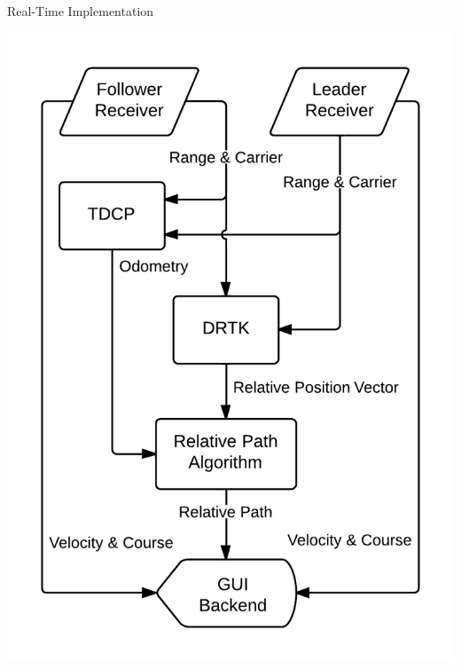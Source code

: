 \documentclass{beamer}
\begin{document}
    \begin{frame}{Real-Time Implementation}
      \begin{minipage}{\textwidth}
        \centering
        \includegraphics[height=\textheight]{../graphics/data_algo.png}
      \end{minipage}
    \end{frame}
\end{document}
